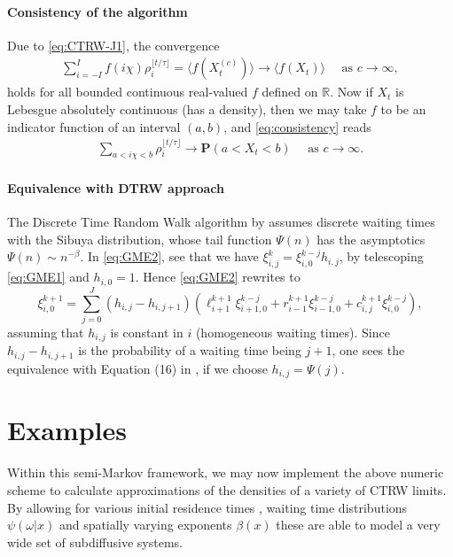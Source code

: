 \documentclass[a4paper,12pt]{elsarticle}
\numberwithin{equation}{section}
\theoremstyle{plain}
\theoremstyle{definition}
\theoremstyle{remark}
\numberwithin{equation}{section}
\newcommand{\R}{\mathbb R}
\newcommand{\1}{\mathbf 1}
\newcommand{\pr}{\mathbf P}
\begin{document}
\paragraph{Consistency of the algorithm}
Due to \eqref{eq:CTRW-J1}, the convergence
\begin{align} \label{eq:consistency}
  \sum_{i=-I}^I f(i\chi) \rho^{\lfloor t/\tau \rfloor}_i 
  = \langle f(X^{(c)}_t) \rangle 
  \longrightarrow \langle f(X_t) \rangle
  \quad \text{ as } c \to \infty, 
\end{align}
holds for all bounded continuous real-valued $f$ defined on $\R$.
Now if $X_t$ is Lebesgue absolutely continuous (has a density), then we may take $f$ to be an indicator function of an interval $(a,b)$, and \eqref{eq:consistency} reads
\begin{align}
  \sum_{a < i\chi < b} \rho_i^{\lfloor t / \tau \rfloor} 
  \longrightarrow
  \pr(a < X_t < b) \quad \text{ as } c \to \infty.
\end{align}


\paragraph{Equivalence with DTRW approach}  The Discrete Time Random Walk algorithm by
\cite{Angstmann2015a} assumes discrete waiting times with the Sibuya
distribution, whose tail function $\Psi(n)$ has the asymptotics
$\Psi(n) \sim n^{-\beta}$.
In \eqref{eq:GME2}, see that we have $\xi^k_{i,j} = \xi^{k-j}_{i,0} h_{i,j}$,
by telescoping \eqref{eq:GME1} and $h_{i,0} = 1$.  Hence
\eqref{eq:GME2} rewrites to
$$\xi^{k+1}_{i,0} = \sum_{j=0}^J (h_{i,j} - h_{i,j+1})
(\ell^{k+1}_{i+1} \xi^{k-j}_{i+1, 0} + r^{k+1}_{i-1} \xi^{k-j}_{i-1,0} + c^{k+1}_{i,j} \xi^{k-j}_{i,0}),$$
assuming that $h_{i,j}$ is constant in $i$ (homogeneous waiting times). 
Since $h_{i,j} - h_{i,j+1}$ is the probability of a waiting time being
$j+1$, one sees the equivalence with Equation (16) in \cite{Angstmann2015a},
if we choose $h_{i,j} = \Psi(j)$.

\section{Examples}
\label{sec:examples}

Within this semi-Markov framework, we may now implement the above numeric scheme to calculate approximations of the densities of a variety of CTRW limits. By allowing for various initial residence times \cite{Gill2016}, waiting time distributions $\psi (\omega | x)$ and spatially varying exponents $\beta (x)$ these are able to model a very wide set of subdiffusive systems. \\
\end{document}
